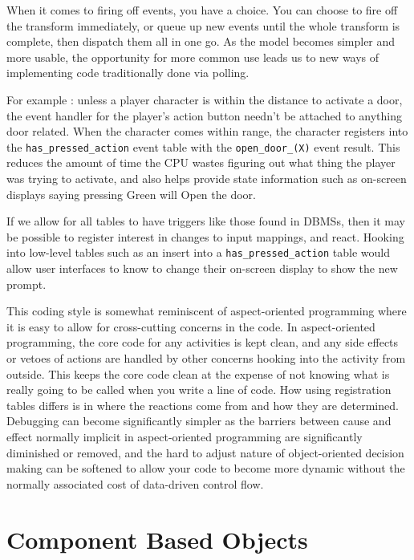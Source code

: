 \documentclass[a4paper,12pt]{article}
\begin{document}
When it comes to firing off events, you have a choice.
You can choose to fire off the transform immediately, or queue up new events until the whole transform is complete, then dispatch them all in one go.
As the model becomes simpler and more usable, the opportunity for more common use leads us to new ways of implementing code traditionally done via polling.

For example :
unless a player character is within the distance to activate a door, the event handler for the player's action button needn't be attached to anything door related.
When the character comes within range, the character registers into the \texttt{has\_pressed\_action} event table with the \texttt{open\_door\_(X)} event result.
This reduces the amount of time the CPU wastes figuring out what thing the player was trying to activate, and also helps provide state information such as on-screen displays saying pressing Green will Open the door.

If we allow for all tables to have triggers like those found in DBMSs, then it may be possible to register interest in changes to input mappings, and react.
Hooking into low-level tables such as an insert into a \texttt{has\_pressed\_action} table would allow user interfaces to know to change their on-screen display to show the new prompt.

This coding style is somewhat reminiscent of aspect-oriented programming where it is easy to allow for cross-cutting concerns in the code.
In aspect-oriented programming, the core code for any activities is kept clean, and any side effects or vetoes of actions are handled by other concerns hooking into the activity from outside.
This keeps the core code clean at the expense of not knowing what is really going to be called when you write a line of code.
How using registration tables differs is in where the reactions come from and how they are determined.
Debugging can become significantly simpler as the barriers between cause and effect normally implicit in aspect-oriented programming are significantly diminished or removed, and the hard to adjust nature of object-oriented decision making can be softened to allow your code to become more dynamic without the normally associated cost of data-driven control flow.

\newpage
\section{Component Based Objects}
\end{document}
